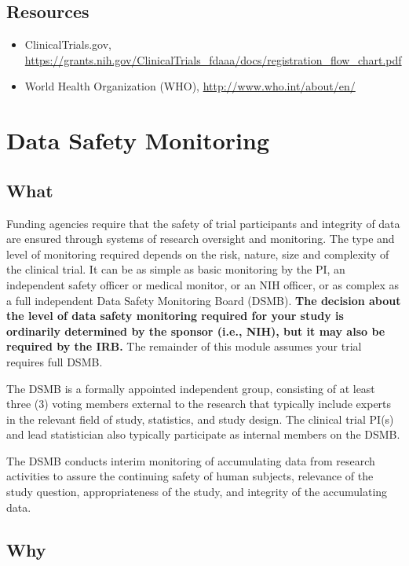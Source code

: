\documentclass[]{book}
\providecommand{\tightlist}{%
  \setlength{\itemsep}{0pt}\setlength{\parskip}{0pt}}
\theoremstyle{definition}
\theoremstyle{definition}
\theoremstyle{definition}
\theoremstyle{remark}
\begin{document}
\subsection{Resources}\label{resources-7}

\begin{itemize}
\tightlist
\item
  ClinicalTrials.gov,
  \url{https://grants.nih.gov/ClinicalTrials_fdaaa/docs/registration_flow_chart.pdf}
\item
  World Health Organization (WHO), \url{http://www.who.int/about/en/}
\end{itemize}

\section{Data Safety Monitoring}\label{data-safety-monitoring}

\subsection{What}\label{what-9}

Funding agencies require that the safety of trial participants and
integrity of data are ensured through systems of research oversight and
monitoring. The type and level of monitoring required depends on the
risk, nature, size and complexity of the clinical trial. It can be as
simple as basic monitoring by the PI, an independent safety officer or
medical monitor, or an NIH officer, or as complex as a full independent
Data Safety Monitoring Board (DSMB). \textbf{The decision about the
level of data safety monitoring required for your study is ordinarily
determined by the sponsor (i.e., NIH), but it may also be required by
the IRB.} The remainder of this module assumes your trial requires full
DSMB.

The DSMB is a formally appointed independent group, consisting of at
least three (3) voting members external to the research that typically
include experts in the relevant field of study, statistics, and study
design. The clinical trial PI(s) and lead statistician also typically
participate as internal members on the DSMB.

The DSMB conducts interim monitoring of accumulating data from research
activities to assure the continuing safety of human subjects, relevance
of the study question, appropriateness of the study, and integrity of
the accumulating data.

\subsection{Why}\label{why-9}
\end{document}
